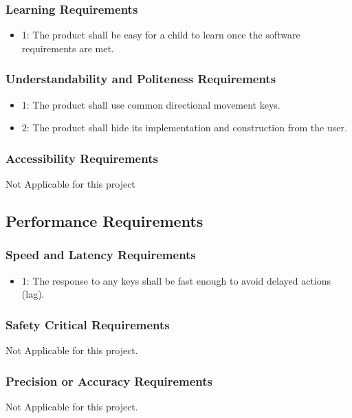 \documentclass[12pt]{article}
\begin{document}
\subsubsection*{Learning Requirements}
\begin{itemize}
\item 1: The product shall be easy for a child to learn once the software requirements are met.
\end{itemize}

\subsubsection*{Understandability and Politeness Requirements}
\begin{itemize}
\item 1: The product shall use common directional movement keys.
\item 2: The product shall hide its implementation and construction from the user.
\end{itemize}

\subsubsection*{Accessibility Requirements}
Not Applicable for this project

\subsection{Performance Requirements}

\subsubsection*{Speed and Latency Requirements}
\begin{itemize}
\item 1: The response to any keys shall be fast enough to avoid delayed actions (lag).
\end{itemize}

\subsubsection*{Safety Critical Requirements}
Not Applicable for this project.
\subsubsection*{Precision or Accuracy Requirements}
Not Applicable for this project.
\end{document}
